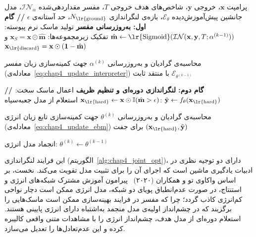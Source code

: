 \begin{algorithm}[ht]
\caption{آموزش مشترک شبکه‌های مفسر و انرژی (بهینه‌سازی تناوبی)}\label{alg:chap4_joint_opt}
\begin{algorithmic}[1]
\vspace{0.25cm}
\Require{} پرامپت $\mathbf{x}$، خروجی $\mathbf{y}$، شاخص‌های هدف خروجی $T$، مفسر مقداردهی‌شده $\mathcal{IN}_\alpha$، مدل جانشین پیش‌آموزش‌دیده $\mathcal{E}_\theta$، بازه‌ی لنگراندازی $N_{\text{\lr{ground}}}$، حد آستانه‌ی $\epsilon$
\vspace{0.25cm}
    \vspace{0.15cm}
    \State{} \textbf{// گام اول: به‌روزرسانی مفسر}
    \vspace{0.15cm}
    \State{} تولید ماسک نرم پیوسته: $\hat{\mathbf{m}} \leftarrow \text{\lr{Sigmoid}}(\mathcal{IN}(\mathbf{x}, \mathbf{y}, T; \alpha^{(k-1)}))$
    \State{} تفکیک زیرمجموعه‌ها: $\mathbf{x}_S = \mathbf{x} \odot \hat{\mathbf{m}}$ و $\mathbf{x}_{\text{\lr{discard}}} = \mathbf{x} \odot (\mathbf{1} - \hat{\mathbf{m}})$
    \State{} \parbox[t]{0.95\linewidth}{محاسبه‌ی گرادیان و به‌روزرسانی $\alpha^{(k)}$ جهت کمینه‌سازی زیان مفسر (معادله‌ی~\ref{eq:chap4_update_interpreter}) با منتقد ثابت $\mathcal{E}_{\theta^{(k-1)}}$}
    \vspace{0.25cm}
    \State{} \textbf{// گام دوم: لنگراندازی دوره‌ای و تنظیم ظریف }
    \vspace{0.15cm}
        \State{} اعمال ماسک سخت: $\mathbf{x}_{\text{\lr{hard}}} \leftarrow \mathbf{x} \odot \mathbb{I}(\hat{\mathbf{m}} > \epsilon)$
        \State{} استعلام از مدل جعبه‌سیاه: $\tilde{\mathbf{y}} \leftarrow f_\theta(\mathbf{x}_{\text{\lr{hard}}})$
        \State{} \parbox[t]{0.9\linewidth}{محاسبه‌ی گرادیان و به‌روزرسانی $\theta^{(k)}$ جهت کمینه‌سازی تابع زیان انرژی (معادله‌ی~\ref{eq:chap4_update_ebm}) برای جفت $(\mathbf{x}_{\text{\lr{hard}}}, \tilde{\mathbf{y}})$}
    \vspace{0.15cm}
    \Else{}
        \State{} انجماد مدل انرژی: $\theta^{(k)} \leftarrow \theta^{(k-1)}$
    \EndIf{}
    \vspace{0.25cm}
\EndFor{}
\end{algorithmic}
\end{algorithm}

این فرایند لنگراندازی (الگوریتم~\ref{alg:chap4_joint_opt})، دارای دو توجیه نظری در ادبیات یادگیری ماشین است که اجرای آن را برای تثبیت مدل تقویت می‌کند. نخست، بر اساس واکاوی تو و همکاران (۲۰۲۰)~\cite{tu2020improving} پیرامون آموزش مشترک شبکه‌های انرژی و استنتاج، در صورت عدم‌انطباق پویای دو شبکه، مدل انرژی ممکن است دچار نواحی کم‌انرژی کاذب گردد؛ چرا که مفسر در فرایند بهینه‌سازی ممکن است ماسک‌هایی را برگزیند که در چشم‌انداز اولیه‌ی مدل منجمد به‌اشتباه دارای انرژی پایینی هستند. استعلام دوره‌ای از مدل هدف، چشم‌انداز انرژی را با مشاهدات متنی واقعی کالیبره کرده و این عدم‌تعادل‌ها را تعدیل می‌سازد.

